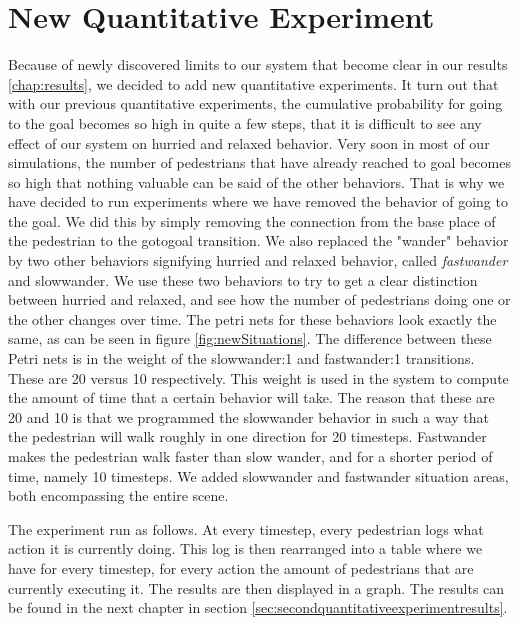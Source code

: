 \documentclass[11pt]{book}
\begin{document}
\section{New Quantitative Experiment}
\label{sec:quantitativeexp2}
Because of newly discovered limits to our system that become clear in our results \ref{chap:results}, we decided to add new quantitative experiments. It turn out that with our previous quantitative experiments, the cumulative probability for going to the goal becomes so high in quite a few steps, that it is difficult to see any effect of our system on hurried and relaxed behavior. Very soon in most of our simulations, the number of pedestrians that have already reached to goal becomes so high that nothing valuable can be said of the other behaviors. That is why we have decided to run experiments where we have removed the behavior of going to the goal. We did this by simply removing the connection from the base place of the pedestrian to the gotogoal transition.
We also replaced the "wander" behavior by two other behaviors signifying hurried and relaxed behavior, called \emph{fastwander} and {slowwander}. We use these two behaviors to try to get a clear distinction between hurried and relaxed, and see how the number of pedestrians doing one or the other changes over time. The petri nets for these behaviors look exactly the same, as can be seen in figure \ref{fig:newSituations}. The difference between these Petri nets is in the weight of the slowwander:1 and fastwander:1 transitions. These are 20 versus 10 respectively. This weight is used in the system to compute the amount of time that a certain behavior will take. The reason that these are 20 and 10 is that we programmed the slowwander behavior in such a way that the pedestrian will walk roughly in one direction for 20 timesteps. Fastwander makes the pedestrian walk faster than slow wander, and for a shorter period of time, namely 10 timesteps. We added slowwander and fastwander situation areas, both encompassing the entire scene.

The experiment run as follows. At every timestep, every pedestrian logs what action it is currently doing. This log is then rearranged into a table where we have for every timestep, for every action the amount of pedestrians that are currently executing it. The results are then displayed in a graph. The results can be found in the next chapter in section \ref{sec:secondquantitativeexperimentresults}.
\end{document}
